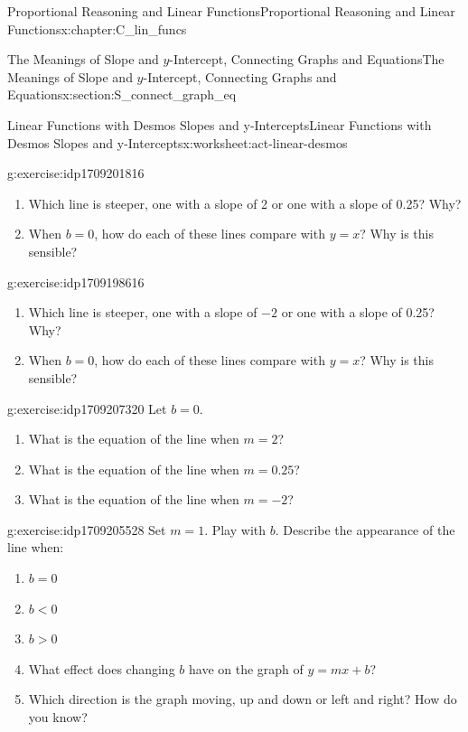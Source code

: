\documentclass[oneside,10pt,]{book}
\numberwithin{equation}{chapter}
\newcommand{\lt}{<}
\newcommand{\gt}{>}
\begin{document}
\begin{chapterptx}{Proportional Reasoning and Linear Functions}{}{Proportional Reasoning and Linear Functions}{}{}{x:chapter:C_lin_funcs}
\begin{sectionptx}{The Meanings of Slope and \(y\)-Intercept, Connecting Graphs and Equations}{}{The Meanings of Slope and \(y\)-Intercept, Connecting Graphs and Equations}{}{}{x:section:S_connect_graph_eq}
\begin{worksheet-subsection}{Linear Functions with Desmos \textemdash{} Slopes and y-Intercepts}{}{Linear Functions with Desmos \textemdash{} Slopes and y-Intercepts}{}{}{x:worksheet:act-linear-desmos}
\begin{divisionexercise}{4}{}{}{g:exercise:idp1709201816}%
\begin{enumerate}[font=\bfseries,label=(\alph*),ref=\alph*]
\item{}Which line is steeper, one with a slope of 2 or one with a slope of 0.25? Why?%
\item{}When \(b = 0\), how do each of these lines compare with \(y = x\)? Why is this sensible?%
\end{enumerate}
\end{divisionexercise}%
\begin{divisionexercise}{5}{}{}{g:exercise:idp1709198616}%
\begin{enumerate}[font=\bfseries,label=(\alph*),ref=\alph*]
\item{}Which line is steeper, one with a slope of \(-2\) or one with a slope of 0.25? Why?%
\item{}When \(b = 0\), how do each of these lines compare with \(y = x\)? Why is this sensible?%
\end{enumerate}
\end{divisionexercise}%
\begin{divisionexercise}{6}{}{}{g:exercise:idp1709207320}%
Let \(b = 0\).%
\begin{enumerate}[font=\bfseries,label=(\alph*),ref=\alph*]
\item{}What is the equation of the line when \(m = 2\)?%
\item{}What is the equation of the line when \(m = 0.25\)?%
\item{}What is the equation of the line when \(m = -2\)?%
\end{enumerate}
\end{divisionexercise}%
\begin{divisionexercise}{7}{}{}{g:exercise:idp1709205528}%
Set \(m = 1\). Play with \(b\). Describe the appearance of the line when:%
\begin{enumerate}[font=\bfseries,label=(\alph*),ref=\alph*]
\item{}\(b = 0\)%
\item{}\(b \lt 0\)%
\item{}\(b \gt 0\)%
\item{}What effect does changing \(b\) have on the graph of \(y = mx + b\)?%
\item{}Which direction is the graph moving, up and down or left and right? How do you know?%
\end{enumerate}
\end{divisionexercise}%

\end{worksheet-subsection}
\end{sectionptx}
\end{chapterptx}
\end{document}
